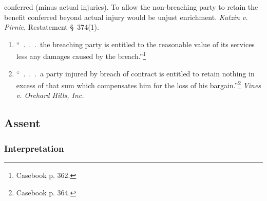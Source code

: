\begin{enumerate}
{    conferred} (minus actual injuries). To allow the non-breaching party to 
    retain the benefit conferred beyond actual injury would be unjust 
    enrichment. \emph{Kutzin v. Pirnie}, Restatement \S\ 374(1).
    \begin{enumerate}
        \item ``~.~.~.~the breaching party is entitled to the reasonable value 
        of its services less any damages caused by the 
        breach.''\footnote{Casebook p. 362.}
        \item ``~.~.~.~a party injured by breach of contract is entitled to 
        retain nothing in excess of that sum which compensates him for the 
        loss of his bargain.''\footnote{Casebook p. 364.} \emph{Vines v. 
        Orchard Hills, Inc.}
    \end{enumerate}
\end{enumerate}

\subsection{Assent}

\subsubsection{Interpretation}

